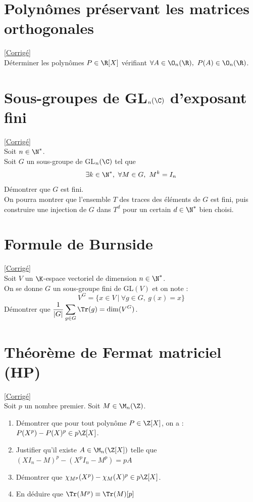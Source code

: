 \documentclass[8pt]{book}
\begin{document}
\section{Polynômes préservant les matrices orthogonales }
\label{Polynômes préservant les matrices orthogonales}
\textcolor{blue}{\hyperref[Polynômes préservant les matrices orthogonales corrigé]{[Corrigé]}}\\
Déterminer les polynômes $P\in \R[X]$ vérifiant $\forall A\in \O_n(\R),\ P(A)\in \O_n(\R)$.

\section{Sous-groupes de GL$_n(\C)$ d'exposant fini }
\label{Sous-groupes de GL_n(C) d'exposant fini}
\textcolor{blue}{\hyperref[Sous-groupes de GL_n(C) d'exposant fini corrigé]{[Corrigé]}}\\
Soit $n\in \N^*$.\\
Soit $G$ un sous-groupe de GL$_n(\C)$ tel que $$\exists k\in \N^*,\ \forall M\in G,\ M^k=I_n$$
Démontrer que $G$ est fini.\\
On pourra montrer que l'ensemble $T$ des traces des éléments de $G$ est fini, puis construire une injection de $G$ dans $T^d$ pour un certain $d\in \N^*$ bien choisi.

\section{Formule de Burnside }
\label{Formule de Burnside}
\textcolor{blue}{\hyperref[Formule de Burnside corrigé]{[Corrigé]}}\\
Soit $V$ un $\K$-espace vectoriel de dimension $n\in \N^*$.\\
On se donne $G$ un sous-groupe fini de GL$(V)$ et on note :
$$V^G=\{x\in V\ |\ \forall g\in G,\ g(x)=x\}$$
Démontrer que $\displaystyle\frac{1}{|G|}\sum\limits_{g\in G}\Tr(g)=\dim(V^G)$.

\section{Théorème de Fermat matriciel  (HP)}
\label{Théorème de Fermat matriciel}
\textcolor{blue}{\hyperref[Théorème de Fermat matriciel corrigé]{[Corrigé]}}\\
Soit $p$ un nombre premier. Soit $M\in\M_n(\Z)$.
\begin{enumerate}
	\item Démontrer que pour tout polynôme $P\in\Z[X]$,
	on a : $P(X^p)-P(X)^p\in p\Z[X]$.
	\item Justifier qu'il existe $A\in\M_n(\Z[X])$ telle que $(XI_n-M)^p-(X^pI_n-M^p)=pA$
	\item Démontrer que $\chi_{M^p}(X^p)-\chi_M(X)^p\in p\Z[X]$.
	\item En déduire que $\Tr(M^p)\equiv \Tr(M)[p]$
\end{enumerate}
\end{document}
